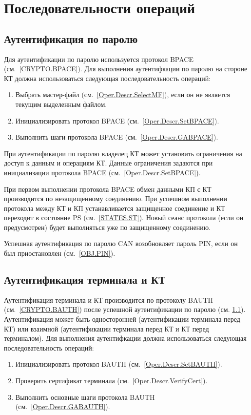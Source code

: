 \section{Последовательности операций}
\label{Oper.Seq}

\subsection{Аутентификация по паролю}
\label{Oper.Seq.BPACE}

Для аутентификации по паролю используется протокол BPACE (см.~\ref{CRYPTO.BPACE}). 
Для выполнения аутентифкации по паролю на стороне КТ должна 
использоваться следующая последовательность операций:

\begin{enumerate}
\item Выбрать мастер-файл (см.~\ref{Oper.Descr.SelectMF}), 
если он не является текущим выделенным файлом.

\item Инициализировать протокол BPACE (см.~\ref{Oper.Descr.SetBPACE}).

\item Выполнить шаги протокола BPACE (см.~\ref{Oper.Descr.GABPACE}).

\end{enumerate}

При аутентификации по паролю владелец КТ может
установить ограничения на доступ к данным и операциям КТ.
Данные ограничения задаются при инициализации 
протокола BPACE (см.~\ref{Oper.Descr.SetBPACE}).

При первом выполнении протокола BPACE обмен данными КП с КТ производится 
по незащищенному соединению. При успешном выполнении протокола между КТ и 
КП устанавливается защищенное соединение и КТ переходит в состояние PS
(см.~\ref{STATES.ST}). Новый сеанс протокола (если он 
предусмотрен) будет выполняться уже по защищенному соединению. 

Успешная аутентификация по паролю CAN возобновляет пароль PIN,  
если он был приостановлен (см.~\ref{OBJ.PIN}).

\subsection{Аутентификация терминала и КТ}
\label{Oper.Seq.BAUTH}

Аутентификация терминала и КТ производится по протоколу BAUTH (см.~\ref{CRYPTO.BAUTH}) 
после успешной аутентификации по паролю (см. \ref{Oper.Seq.BPACE}).
Аутентификация может быть односторонней (аутентификации терминала перед КТ)
или взаимной (аутентификации терминала перед КТ и КТ перед терминалом).
Для выполнения аутентифкации должна 
использоваться следующая последовательность операций:
%
\begin{enumerate}
\item Инициализировать протокол BAUTH (см.~\ref{Oper.Descr.SetBAUTH}).
\item Проверить сертификат терминала (см.~\ref{Oper.Descr.VerifyCert}).
\item Выполнить основные шаги протокола BAUTH (см.~\ref{Oper.Descr.GABAUTH}).
\end{enumerate}

